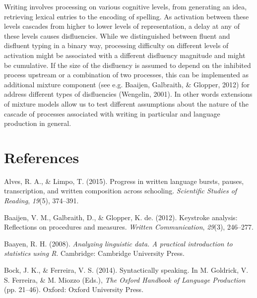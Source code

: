 \documentclass[english,jou,floatsintext]{apa7}
\begin{document}
Writing involves processing on various cognitive levels, from generating an idea, retrieving lexical entries to the encoding of spelling. As activation between these levels cascades from higher to lower levels of representation, a delay at any of these levels causes disfluencies. While we distinguished between fluent and disfluent typing in a binary way, processing difficulty on different levels of activation might be associated with a different disfluency magnitude and might be cumulative. If the size of the disfluency is assumed to depend on the inhibited process upstream or a combination of two processes, this can be implemented as additional mixture component (see e.g. Baaijen, Galbraith, \& Glopper, 2012) for address different types of disfluencies (Wengelin, 2001). In other words extensions of mixture models allow us to test different assumptions about the nature of the cascade of processes associated with writing in particular and language production in general.

\hypertarget{references}{%
\section{References}\label{references}}

\begingroup
\setlength{\parindent}{-0.5in}
\setlength{\leftskip}{0.5in}

\hypertarget{ref}{}

\endgroup

\hypertarget{refs}{}
\leavevmode\hypertarget{ref-alves2015progress}{}%
Alves, R. A., \& Limpo, T. (2015). Progress in written language bursts, pauses, transcription, and written composition across schooling. \emph{Scientific Studies of Reading}, \emph{19}(5), 374--391.

\leavevmode\hypertarget{ref-baaijen2012keystroke}{}%
Baaijen, V. M., Galbraith, D., \& Glopper, K. de. (2012). Keystroke analysis: Reflections on procedures and measures. \emph{Written Communication}, \emph{29}(3), 246--277.

\leavevmode\hypertarget{ref-baa08book}{}%
Baayen, R. H. (2008). \emph{Analyzing linguistic data. A practical introduction to statistics using R}. Cambridge: Cambridge University Press.

\leavevmode\hypertarget{ref-bock2014syntactically}{}%
Bock, J. K., \& Ferreira, V. S. (2014). Syntactically speaking. In M. Goldrick, V. S. Ferreira, \& M. Miozzo (Eds.), \emph{The Oxford Handbook of Language Production} (pp. 21--46). Oxford: Oxford University Press.
\end{document}
